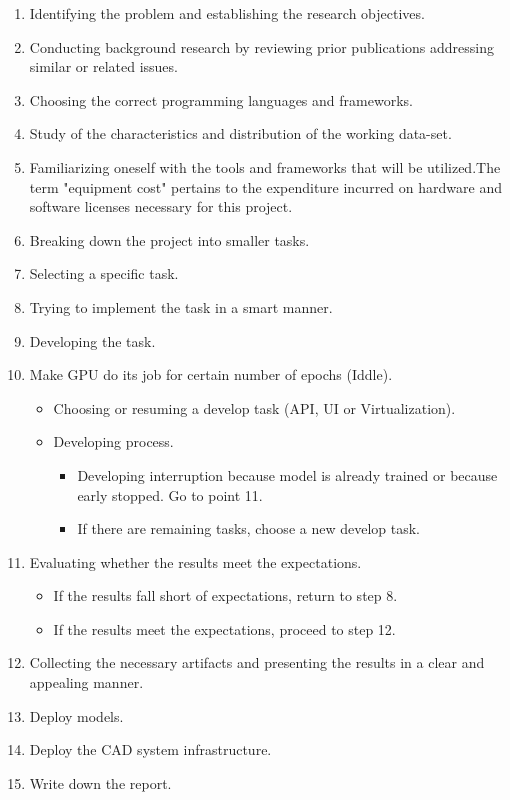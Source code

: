 \begin{enumerate}

  \item Identifying the problem and establishing the research objectives.
  \item Conducting background research by reviewing prior publications addressing similar or related issues.
  \item Choosing the correct programming languages and frameworks.
  \item Study of the characteristics and distribution of the working data-set.
  \item Familiarizing oneself with the tools and frameworks that will be utilized.The term "equipment cost" pertains to the expenditure incurred on hardware and software licenses necessary for this project.
  \item Breaking down the project into smaller tasks.
  \item Selecting a specific task.
  \item Trying to implement the task in a smart manner.
  \item Developing the task.
  \item Make GPU do its job for certain number of epochs (Iddle).

    \begin{itemize}
      \item Choosing or resuming a develop task (API, UI or Virtualization).
      \item Developing process.
        \begin{itemize}
          \item Developing interruption because model is already trained or because early stopped. Go to point 11.
          \item If there are remaining tasks, choose a new develop task.
        \end{itemize}
    \end{itemize}


  \item Evaluating whether the results meet the expectations.

    \begin{itemize}
      \item If the results fall short of expectations, return to step 8.
      \item If the results meet the expectations, proceed to step 12.
    \end{itemize}

  \item Collecting the necessary artifacts and presenting the results in a clear and appealing manner.

  \item Deploy models.

  \item Deploy the CAD system infrastructure.

  \item Write down the report.

\end{enumerate}

